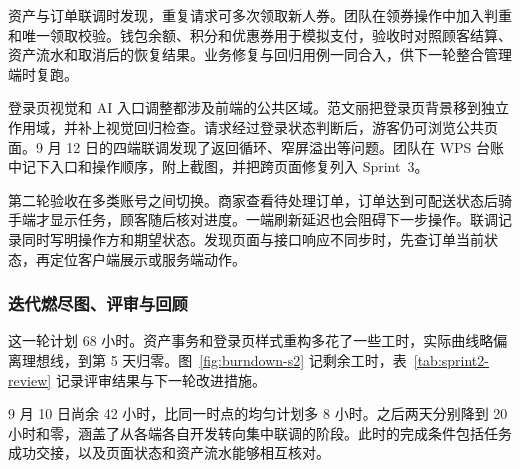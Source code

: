 资产与订单联调时发现，重复请求可多次领取新人券。团队在领券操作中加入判重和唯一领取校验。钱包余额、积分和优惠券用于模拟支付，验收时对照顾客结算、资产流水和取消后的恢复结果。业务修复与回归用例一同合入，供下一轮\mbox{整合管理端时复跑}。

登录页视觉和 AI 入口调整都涉及前端的公共区域。范文丽把登录页背景移到独立作用域，并补上视觉回归检查。请求经过登录状态判断后，游客仍可浏览公共页面。9 月 12 日的四端联调发现了返回循环、窄屏溢出等问题。团队在 WPS 台账中记下入口和操作顺序，附上截图，并把跨页面修复列入 Sprint~3。

第二轮验收在多类账号之间切换。商家查看待处理订单，订单达到可配送状态后骑手端才显示任务，顾客随后核对进度。一端刷新延迟也会阻碍下一步操作。联调记录同时写明操作方和期望状态。发现页面与接口响应不同步时，先查订单当前状态，再定位客户端展示或服务端动作。

\subsubsection{迭代燃尽图、评审与回顾}
这一轮计划 68 小时。资产事务和登录页样式重构多花了一些工时，实际曲线略偏离理想线，到第 5 天归零。图~\ref{fig:burndown-s2} 记剩余工时，表~\ref{tab:sprint2-review} 记录评审结果与下一轮改进措施。

9 月 10 日尚余 42 小时，比同一时点的均匀计划多 8 小时。之后两天分别降到 20 小时和零，涵盖了从各端各自开发转向集中联调的阶段。此时的完成条件包括任务成功交接，以及页面状态和资产流水能够相互核对。

